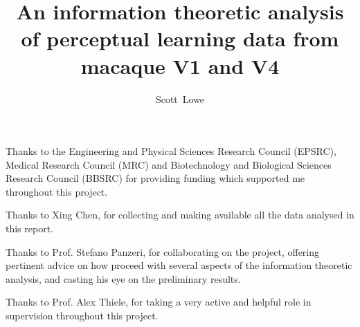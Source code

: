 \documentclass[mscres,ianc,logo,twoside,deptreport]{infthesis} %
\title{An information theoretic analysis of perceptual learning data from macaque V1 and V4}
\author{Scott~Lowe}
\begin{document}
%
\begin{preliminary}
%
\maketitle
%
%
\begin{acknowledgements}
Thanks to the Engineering and Physical Sciences Research Council (EPSRC), Medical Research Council (MRC) and Biotechnology and Biological Sciences Research Council (BBSRC) for providing funding which supported me throughout this project.

Thanks to Xing Chen, for collecting and making available all the data analysed in this report.

Thanks to Prof. Stefano Panzeri, for collaborating on the project, offering pertinent advice on how proceed with several aspects of the information theoretic analysis, and casting his eye on the preliminary results.

Thanks to Prof. Alex Thiele, for taking a very active and helpful role in supervision throughout this project.
\end{acknowledgements}
%
%
\standarddeclaration
%
%
\tableofcontents
%
%
\end{preliminary}
%
%
%

% 



%
%
\appendix
% 
%
%
%
% 
%

%
%
\end{document}
